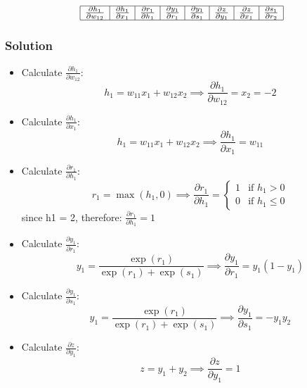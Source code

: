 \documentclass{article}
\begin{document}
\begin{enumerate}[label=\alph*)]
   
   
   \[
   \begin{array}{|c|c|c|c|c|c|c|c|}
   \hline
   \frac{\partial h_1}{\partial w_{12}} & \frac{\partial h_1}{\partial x_1} & \frac{\partial r_1}{\partial h_1} & 
   \frac{\partial y_1}{\partial r_1} & \frac{\partial y_1}{\partial s_1} & \frac{\partial z}{\partial y_1} &
   \frac{\partial z}{\partial x_1} & \frac{\partial s_1}{\partial r_2} \\
   \hline
   \end{array}
   \]

   \subsubsection{Solution}
   \begin{itemize}
      \item Calculate \(\frac{\partial h_1}{\partial w_{12}}\):
      \[
      h_1 = w_{11} x_1 + w_{12} x_2 \implies \frac{\partial h_1}{\partial w_{12}} = x_2 = -2
      \]

      \item Calculate \(\frac{\partial h_1}{\partial x_1}\):
      \[
      h_1 = w_{11} x_1 + w_{12} x_2 \implies \frac{\partial h_1}{\partial x_1} = w_{11} 
      \]

      \item Calculate \(\frac{\partial r_1}{\partial h_1}\):
      \[
      r_1 = \max(h_1, 0) \implies \frac{\partial r_1}{\partial h_1} = 
      \begin{cases} 
         1 & \text{if } h_1 > 0 \\
         0 & \text{if } h_1 \leq 0 
      \end{cases}
      \]
      since h1 = 2, therefore: \(\frac{\partial r_1}{\partial h_1} = 1\)

      \item Calculate \(\frac{\partial y_1}{\partial r_1}\):
      \[
      y_1 = \frac{\exp(r_1)}{\exp(r_1) + \exp(s_1)} \implies \frac{\partial y_1}{\partial r_1} = y_1 (1 - y_1)
      \]

      \item Calculate \(\frac{\partial y_1}{\partial s_1}\):
      \[
      y_1 = \frac{\exp(r_1)}{\exp(r_1) + \exp(s_1)} \implies \frac{\partial y_1}{\partial s_1} = -y_1 y_2
      \]

      \item Calculate \(\frac{\partial z}{\partial y_1}\):
      \[
      z = y_1 + y_2 \implies \frac{\partial z}{\partial y_1} = 1
      \]


\end{itemize}
\end{enumerate}
\end{document}
